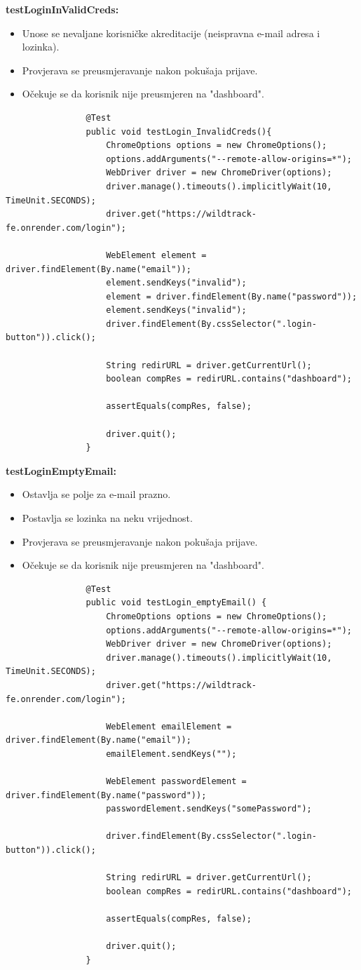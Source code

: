 			\textbf{testLoginInValidCreds:}
			\begin{itemize}
				\item Unose se nevaljane korisničke akreditacije (neispravna e-mail adresa i lozinka).
				\item Provjerava se preusmjeravanje nakon pokušaja prijave.
				\item Očekuje se da korisnik nije preusmjeren na "dashboard".
			\end{itemize}
			\begin{lstlisting}
				@Test
				public void testLogin_InvalidCreds(){
					ChromeOptions options = new ChromeOptions();
					options.addArguments("--remote-allow-origins=*");
					WebDriver driver = new ChromeDriver(options);
					driver.manage().timeouts().implicitlyWait(10, TimeUnit.SECONDS);
					driver.get("https://wildtrack-fe.onrender.com/login");
					
					WebElement element = driver.findElement(By.name("email"));
					element.sendKeys("invalid");
					element = driver.findElement(By.name("password"));
					element.sendKeys("invalid");
					driver.findElement(By.cssSelector(".login-button")).click();
					
					String redirURL = driver.getCurrentUrl();
					boolean compRes = redirURL.contains("dashboard");
					
					assertEquals(compRes, false);
					
					driver.quit();
				}
			\end{lstlisting}
			
			\textbf{testLoginEmptyEmail:}
			\begin{itemize}
				\item Ostavlja se polje za e-mail prazno.
				\item Postavlja se lozinka na neku vrijednost.
				\item Provjerava se preusmjeravanje nakon pokušaja prijave.
				\item Očekuje se da korisnik nije preusmjeren na "dashboard".
			\end{itemize}
			\begin{lstlisting}
				@Test
				public void testLogin_emptyEmail() {
					ChromeOptions options = new ChromeOptions();
					options.addArguments("--remote-allow-origins=*");
					WebDriver driver = new ChromeDriver(options);
					driver.manage().timeouts().implicitlyWait(10, TimeUnit.SECONDS);
					driver.get("https://wildtrack-fe.onrender.com/login");

					WebElement emailElement = driver.findElement(By.name("email"));
					emailElement.sendKeys("");
					
					WebElement passwordElement = driver.findElement(By.name("password"));
					passwordElement.sendKeys("somePassword");
					
					driver.findElement(By.cssSelector(".login-button")).click();
					
					String redirURL = driver.getCurrentUrl();
					boolean compRes = redirURL.contains("dashboard");
					
					assertEquals(compRes, false);
					
					driver.quit();
				}
			\end{lstlisting}
			
